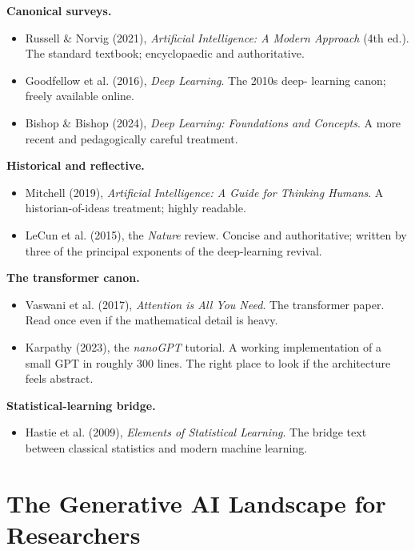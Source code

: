 \documentclass[
  letterpaper,
  11pt]{scrbook}
\providecommand{\tightlist}{%
  \setlength{\itemsep}{0pt}\setlength{\parskip}{0pt}}
\begin{document}
\textbf{Canonical surveys.}

\begin{itemize}
\tightlist
\item
  Russell \& Norvig (2021), \emph{Artificial Intelligence: A Modern
  Approach} (4th ed.). The standard textbook; encyclopaedic and
  authoritative.
\item
  Goodfellow et al. (2016), \emph{Deep Learning}. The 2010s deep-
  learning canon; freely available online.
\item
  Bishop \& Bishop (2024), \emph{Deep Learning: Foundations and
  Concepts}. A more recent and pedagogically careful treatment.
\end{itemize}

\textbf{Historical and reflective.}

\begin{itemize}
\tightlist
\item
  Mitchell (2019), \emph{Artificial Intelligence: A Guide for Thinking
  Humans}. A historian-of-ideas treatment; highly readable.
\item
  LeCun et al. (2015), the \emph{Nature} review. Concise and
  authoritative; written by three of the principal exponents of the
  deep-learning revival.
\end{itemize}

\textbf{The transformer canon.}

\begin{itemize}
\tightlist
\item
  Vaswani et al. (2017), \emph{Attention is All You Need}. The
  transformer paper. Read once even if the mathematical detail is heavy.
\item
  Karpathy (2023), the \emph{nanoGPT} tutorial. A working implementation
  of a small GPT in roughly 300 lines. The right place to look if the
  architecture feels abstract.
\end{itemize}

\textbf{Statistical-learning bridge.}

\begin{itemize}
\tightlist
\item
  Hastie et al. (2009), \emph{Elements of Statistical Learning}. The
  bridge text between classical statistics and modern machine learning.
\end{itemize}

\chapter{The Generative AI Landscape for
Researchers}\label{sec-landscape}
\end{document}
